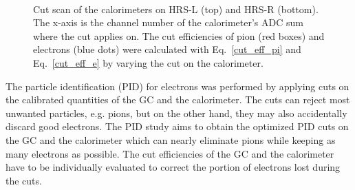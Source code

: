 \begin{figure}[!ht]
  \begin{center}
     \\
     \caption[Cut scan of the calorimeters]{\footnotesize{Cut scan of the calorimeters on HRS-L (top) and HRS-R (bottom). The x-axis is the channel number of the calorimeter's ADC sum where the cut applies on. The cut efficiencies of pion (red boxes) and electrons (blue dots) were calculated with Eq.~\eqref{cut_eff_pi} and Eq.~\eqref{cut_eff_e} by varying the cut on the calorimeter.} }
     \label{calo_cut_scan}
  \end{center}
\end{figure}

 The particle identification (PID) for electrons was performed by applying cuts on the calibrated quantities of the GC and the calorimeter. The cuts can reject most unwanted particles, e.g. pions, but on the other hand, they may also accidentally discard good electrons. The PID study aims to obtain the optimized PID cuts on the GC and the calorimeter which can nearly eliminate pions while keeping as many electrons as possible. The cut efficiencies of the GC and the calorimeter have to be individually evaluated to correct the portion of electrons lost during the cuts. 
 
